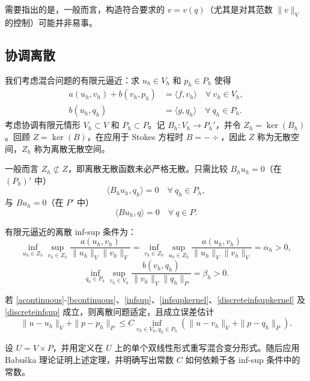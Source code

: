 需要指出的是，一般而言，构造符合要求的 $v = v(q)$（尤其是对其范数 $\|v\|_V$ 的控制）可能并非易事。


\subsection{协调离散}

我们考虑混合问题的有限元逼近：求 $u_h\in V_h$ 和 $p_h\in P_h$ 使得
\begin{align}
a(u_h, v_h)+ b(v_h, p_h) & =\langle f, v_h\rangle \quad \forall~v_h\in V_h, \label{abstractmfem1}\\
b(u_h, q_h) & =\langle g, q_h\rangle  \quad \forall~q_h\in P_h.\label{abstractmfem2}
\end{align}
考虑协调有限元情形 $V_h\subset V$ 和 $P_h\subset P$。记 $B_h: V_h\to P_h'$，并令 $Z_h = \ker(B_h)$。回顾 $Z = \ker(B)$，在应用于 Stokes 方程时 $B = -\div$，因此 $Z$ 称为无散空间，$Z_h$ 称为离散无散空间。

\begin{remark}
一般而言 $Z_h \not\subset Z$，即离散无散函数未必严格无散。只需比较 $B_hu_h = 0$（在 $(P_h)'$ 中）
\[
\langle B_hu_h, q_h\rangle=0\quad\forall~q_h\in P_h,
\]
与 $Bu_h=0$（在 $P'$ 中）
\[
\langle Bu_h, q\rangle=0\quad\forall~q\in P.
\]
\end{remark}

有限元逼近的离散 inf-sup 条件为：
\begin{equation}\label{discreteinfsupkernel}
\inf_{u_h\in Z_h}\sup_{v_h\in Z_h}\frac{a(u_h, v_h)}{\|u_h\|_V\|v_h\|_V}=\inf_{v_h\in Z_h}\sup_{u_h\in Z_h}\frac{a(u_h, v_h)}{\|u_h\|_V\|v_h\|_V}=\alpha_h>0,
\end{equation}
\begin{equation}\label{discreteinfsup}
\inf_{q_h\in P_h}\sup_{v_h\in V_h}\frac{b(v_h, q_h)}{\|v_h\|_V\|q_h\|_P}=\beta_h>0.
\end{equation}

\begin{theorem}
若 \eqref{acontinuous}-\eqref{bcontinuous}、\eqref{infsup}、\eqref{infsupkernel}、\eqref{discreteinfsupkernel} 及 \eqref{discreteinfsup} 成立，则离散问题适定，且成立误差估计
\[
\|u-u_h\|_V+\|p-p_h\|_P\leq C\inf_{v_h\in V_h, q_h\in P_h}(\|u-v_h\|_V+\|p-q_h\|_P).
\]
\end{theorem}

\begin{exe}
设 $U = V\times P$，并用定义在 $U$ 上的单个双线性形式重写混合变分形式。随后应用 Babu\v{s}ka 理论证明上述定理，并明确写出常数 $C$ 如何依赖于各 inf-sup 条件中的常数。
\end{exe}


